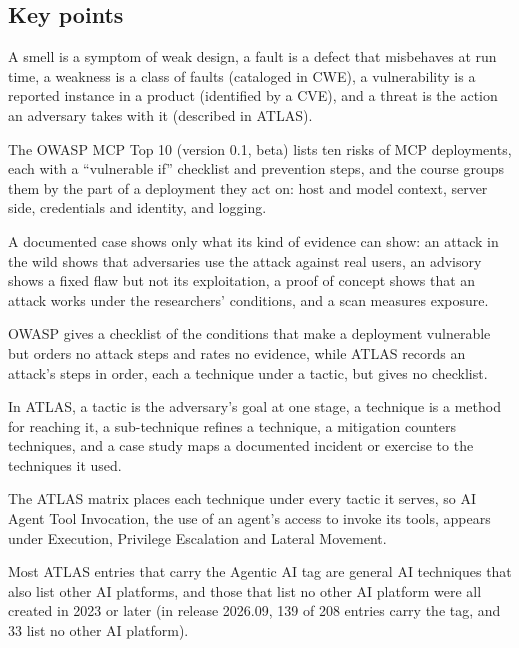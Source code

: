 \subsection*{Key points}
\bi
\item A smell is a symptom of weak design, a fault is a defect that misbehaves at run time, a
weakness is a class of faults (cataloged in CWE), a vulnerability is a reported instance in a product
(identified by a CVE), and a threat is the action an adversary takes with it (described in ATLAS).
\item The OWASP MCP Top 10 (version 0.1, beta) lists ten risks of MCP deployments, each with a
``vulnerable if'' checklist and prevention steps, and the course groups them by the part of a
deployment they act on: host and model context, server side, credentials and identity, and logging.
\item A documented case shows only what its kind of evidence can show: an attack in the wild shows
that adversaries use the attack against real users, an advisory shows a fixed flaw but not its
exploitation, a proof of concept shows that an attack works under the researchers' conditions, and a
scan measures exposure.
\item OWASP gives a checklist of the conditions that make a deployment vulnerable but orders no
attack steps and rates no evidence, while ATLAS records an attack's steps in order, each a
technique under a tactic, but gives no checklist.
\item In ATLAS, a tactic is the adversary's goal at one stage, a technique is a method for reaching
it, a sub-technique refines a technique, a mitigation counters techniques, and a case study maps a
documented incident or exercise to the techniques it used.
\item The ATLAS matrix places each technique under every tactic it serves, so AI Agent Tool
Invocation, the use of an agent's access to invoke its tools, appears under Execution, Privilege
Escalation and Lateral Movement.
\item Most ATLAS entries that carry the Agentic AI tag are general AI techniques that also list
other AI platforms, and those that list no other AI platform were all created in 2023 or later (in
release 2026.09, 139 of 208 entries carry the tag, and 33 list no other AI platform).
\ei

